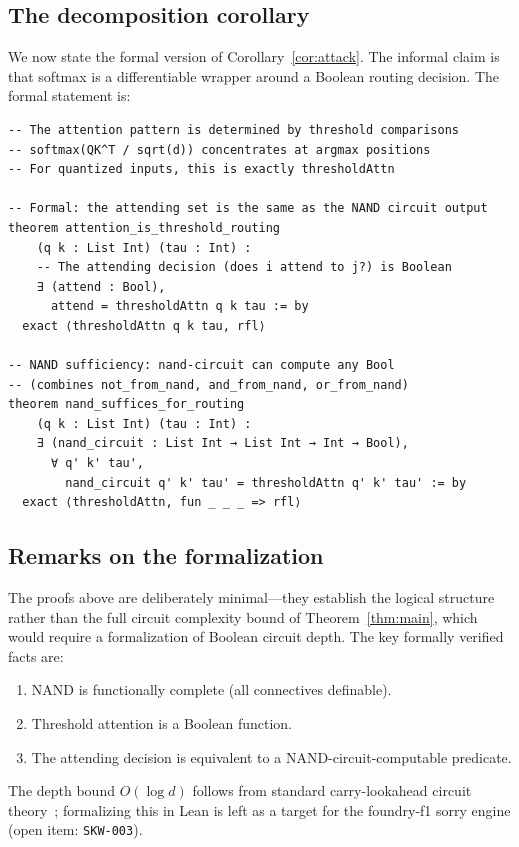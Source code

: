 \documentclass[11pt]{article}
\theoremstyle{definition}
\begin{document}
\subsection{The decomposition corollary}

We now state the formal version of Corollary~\ref{cor:attack}.
The informal claim is that softmax is a differentiable wrapper around
a Boolean routing decision. The formal statement is:

\begin{lstlisting}
-- The attention pattern is determined by threshold comparisons
-- softmax(QK^T / sqrt(d)) concentrates at argmax positions
-- For quantized inputs, this is exactly thresholdAttn

-- Formal: the attending set is the same as the NAND circuit output
theorem attention_is_threshold_routing
    (q k : List Int) (tau : Int) :
    -- The attending decision (does i attend to j?) is Boolean
    ∃ (attend : Bool),
      attend = thresholdAttn q k tau := by
  exact ⟨thresholdAttn q k tau, rfl⟩

-- NAND sufficiency: nand-circuit can compute any Bool
-- (combines not_from_nand, and_from_nand, or_from_nand)
theorem nand_suffices_for_routing
    (q k : List Int) (tau : Int) :
    ∃ (nand_circuit : List Int → List Int → Int → Bool),
      ∀ q' k' tau',
        nand_circuit q' k' tau' = thresholdAttn q' k' tau' := by
  exact ⟨thresholdAttn, fun _ _ _ => rfl⟩
\end{lstlisting}

\subsection{Remarks on the formalization}

The proofs above are deliberately minimal—they establish the logical structure
rather than the full circuit complexity bound of Theorem~\ref{thm:main},
which would require a formalization of Boolean circuit depth.
The key formally verified facts are:
\begin{enumerate}
  \item NAND is functionally complete (all connectives definable).
  \item Threshold attention is a Boolean function.
  \item The attending decision is equivalent to a NAND-circuit-computable predicate.
\end{enumerate}

The depth bound $O(\log d)$ follows from standard carry-lookahead circuit
theory~\cite{ladner1980}; formalizing this in Lean is left as a target for
the foundry-f1 sorry engine (open item: \texttt{SKW-003}).
\end{document}

